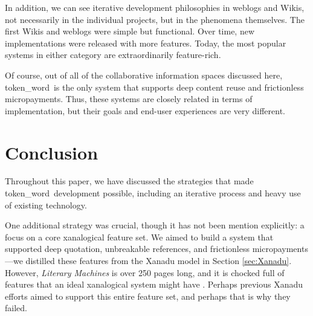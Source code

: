 \documentclass{acm_proc_article-sp}
\newcommand{\tokenWord}{token\_word}
\begin{document}
In addition, we can see iterative development philosophies in weblogs and Wikis, not necessarily in the individual projects, but in the phenomena themselves.
The first Wikis and weblogs were simple but functional.
Over time, new implementations were released with more features.
Today, the most popular systems in either category are extraordinarily feature-rich.

Of course, out of all of the collaborative information spaces discussed here, \tokenWord \  is the only system that supports deep content reuse and frictionless micropayments.
Thus, these systems are closely related in terms of implementation, but their goals and end-user experiences are very different. 




\section{Conclusion}
Throughout this paper, we have discussed the strategies that made \tokenWord \  development possible, including an iterative process and heavy use of existing technology.

One additional strategy was crucial, though it has not been mention explicitly:  a focus on a core xanalogical feature set.
We aimed to build a system that supported deep quotation, unbreakable references, and frictionless micropayments---we distilled these features from the Xanadu model in Section \ref{sec:Xanadu}.
However, \textit{Literary Machines} is over 250 pages long, and it is chocked full of features that an ideal xanalogical system might have \cite{NelsonLiteraryMachines}.
Perhaps previous Xanadu efforts aimed to support this entire feature set, and perhaps that is why they failed.
\end{document}
